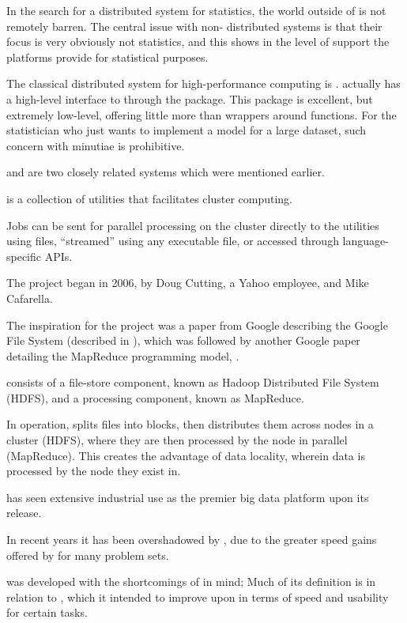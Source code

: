 
In the search for a distributed system for statistics, the world outside of \R{} is not remotely barren.
The central issue with non-\R{} distributed systems is that their focus is very obviously not statistics, and this shows in the level of support the platforms provide for statistical purposes.

The classical distributed system for high-performance computing is .
\R{} actually has a high-level interface to  through the 
package.
This package is excellent, but extremely low-level, offering little more than wrappers around  functions.
For the statistician who just wants to implement a model for a large dataset, such concern with minutiae is prohibitive.

 and  are two closely related systems which were mentioned
earlier.

 is a collection of utilities that facilitates cluster
computing.

Jobs can be sent for parallel processing on the cluster directly to the utilities using  files, ``streamed'' using any executable file, or accessed through language-specific APIs.

The project began in 2006, by Doug Cutting, a Yahoo employee, and Mike Cafarella.

The inspiration for the project was a paper from Google describing the Google File System (described in \textcite{ghemawat2003google}), which was followed by another Google paper detailing the MapReduce programming model, \textcite{dean2004mapreduce}.

 consists of a file-store component, known as Hadoop Distributed
File System (HDFS), and a processing component, known as MapReduce.

In operation,  splits files into blocks, then distributes them across nodes in a cluster (HDFS), where they are then processed by the node in parallel (MapReduce).
This creates the advantage of data locality, wherein data is processed by the node they exist in.

 has seen extensive industrial use as the premier big data
platform upon its release.

In recent years it has been overshadowed by , due to the greater speed gains offered by  for many problem sets.

 was developed with the shortcomings of  in mind; Much of
its definition is in relation to , which it intended to improve
upon in terms of speed and usability for certain
tasks\cite{zaharia2010spark}.

